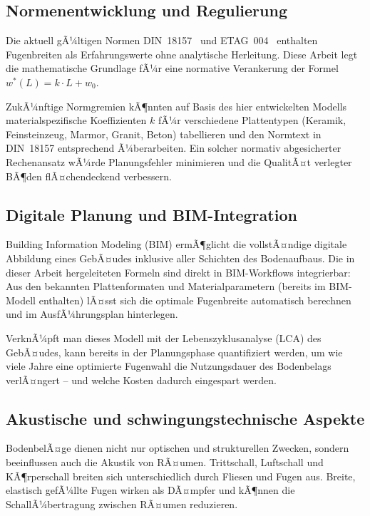 ﻿\documentclass[a4paper,12pt]{article}
\theoremstyle{definition}
\begin{document}
\subsection{Normenentwicklung und Regulierung}

Die aktuell gÃ¼ltigen Normen DIN~18157~\cite{din18157} und ETAG~004~\cite{etag004}
enthalten Fugenbreiten als Erfahrungswerte ohne analytische Herleitung.
Diese Arbeit legt die mathematische Grundlage fÃ¼r eine normative
Verankerung der Formel $w^*(L) = k \cdot L + w_0$.

ZukÃ¼nftige Normgremien kÃ¶nnten auf Basis des hier entwickelten Modells
materialspezifische Koeffizienten $k$ fÃ¼r verschiedene Plattentypen
(Keramik, Feinsteinzeug, Marmor, Granit, Beton) tabellieren und
den Normtext in DIN~18157 entsprechend Ã¼berarbeiten. Ein solcher
normativ abgesicherter Rechenansatz wÃ¼rde Planungsfehler minimieren
und die QualitÃ¤t verlegter BÃ¶den flÃ¤chendeckend verbessern.

\subsection{Digitale Planung und BIM-Integration}

Building Information Modeling (BIM) ermÃ¶glicht die vollstÃ¤ndige
digitale Abbildung eines GebÃ¤udes inklusive aller Schichten des
Bodenaufbaus. Die in dieser Arbeit hergeleiteten Formeln sind
direkt in BIM-Workflows integrierbar: Aus den bekannten Plattenformaten
und Materialparametern (bereits im BIM-Modell enthalten) lÃ¤sst sich
die optimale Fugenbreite automatisch berechnen und im AusfÃ¼hrungsplan
hinterlegen.

VerknÃ¼pft man dieses Modell mit der Lebenszyklusanalyse (LCA)
des GebÃ¤udes, kann bereits in der Planungsphase quantifiziert werden,
um wie viele Jahre eine optimierte Fugenwahl die Nutzungsdauer
des Bodenbelags verlÃ¤ngert -- und welche Kosten dadurch eingespart werden.

\subsection{Akustische und schwingungstechnische Aspekte}

BodenbelÃ¤ge dienen nicht nur optischen und strukturellen Zwecken,
sondern beeinflussen auch die Akustik von RÃ¤umen. Trittschall,
Luftschall und KÃ¶rperschall breiten sich unterschiedlich durch
Fliesen und Fugen aus. Breite, elastisch gefÃ¼llte Fugen wirken
als DÃ¤mpfer und kÃ¶nnen die SchallÃ¼bertragung zwischen RÃ¤umen reduzieren.
\end{document}
